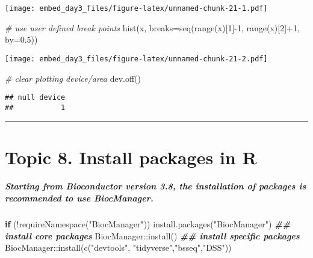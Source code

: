 \documentclass[
]{article}
\newenvironment{Shaded}{\begin{snugshade}}{\end{snugshade}}
\newcommand{\AttributeTok}[1]{\textcolor[rgb]{0.77,0.63,0.00}{#1}}
\newcommand{\CommentTok}[1]{\textcolor[rgb]{0.56,0.35,0.01}{\textit{#1}}}
\newcommand{\ControlFlowTok}[1]{\textcolor[rgb]{0.13,0.29,0.53}{\textbf{#1}}}
\newcommand{\DecValTok}[1]{\textcolor[rgb]{0.00,0.00,0.81}{#1}}
\newcommand{\DocumentationTok}[1]{\textcolor[rgb]{0.56,0.35,0.01}{\textbf{\textit{#1}}}}
\newcommand{\FloatTok}[1]{\textcolor[rgb]{0.00,0.00,0.81}{#1}}
\newcommand{\FunctionTok}[1]{\textcolor[rgb]{0.00,0.00,0.00}{#1}}
\newcommand{\NormalTok}[1]{#1}
\newcommand{\SpecialCharTok}[1]{\textcolor[rgb]{0.00,0.00,0.00}{#1}}
\newcommand{\StringTok}[1]{\textcolor[rgb]{0.31,0.60,0.02}{#1}}
\begin{document}
\texttt{[image: embed\_day3\_files/figure-latex/unnamed-chunk-21-1.pdf]}

\begin{Shaded}
\begin{Highlighting}[]
\CommentTok{\# use user defined break points}
\FunctionTok{hist}\NormalTok{(x, }\AttributeTok{breaks=}\FunctionTok{seq}\NormalTok{(}\FunctionTok{range}\NormalTok{(x)[}\DecValTok{1}\NormalTok{]}\SpecialCharTok{{-}}\DecValTok{1}\NormalTok{, }\FunctionTok{range}\NormalTok{(x)[}\DecValTok{2}\NormalTok{]}\SpecialCharTok{+}\DecValTok{1}\NormalTok{, }\AttributeTok{by=}\FloatTok{0.5}\NormalTok{))}
\end{Highlighting}
\end{Shaded}

\texttt{[image: embed\_day3\_files/figure-latex/unnamed-chunk-21-2.pdf]}

\begin{Shaded}
\begin{Highlighting}[]
\CommentTok{\# clear plotting device/area}
\FunctionTok{dev.off}\NormalTok{()}
\end{Highlighting}
\end{Shaded}

\begin{verbatim}
## null device 
##           1
\end{verbatim}

\begin{center}\rule{0.5\linewidth}{0.5pt}\end{center}

\hypertarget{topic-8.-install-packages-in-r}{%
\section{Topic 8. Install packages in
R}\label{topic-8.-install-packages-in-r}}

\hypertarget{starting-from-bioconductor-version-3.8-the-installation-of-packages-is-recommended-to-use-biocmanager.}{%
\subparagraph{Starting from Bioconductor version 3.8, the installation
of packages is recommended to use
BiocManager.}\label{starting-from-bioconductor-version-3.8-the-installation-of-packages-is-recommended-to-use-biocmanager.}}

\begin{Shaded}
\begin{Highlighting}[]
\ControlFlowTok{if}\NormalTok{ (}\SpecialCharTok{!}\FunctionTok{requireNamespace}\NormalTok{(}\StringTok{"BiocManager"}\NormalTok{))}
    \FunctionTok{install.packages}\NormalTok{(}\StringTok{"BiocManager"}\NormalTok{)}
\DocumentationTok{\#\# install core packages}
\NormalTok{BiocManager}\SpecialCharTok{::}\FunctionTok{install}\NormalTok{()}
\DocumentationTok{\#\# install specific packages}
\NormalTok{BiocManager}\SpecialCharTok{::}\FunctionTok{install}\NormalTok{(}\FunctionTok{c}\NormalTok{(}\StringTok{"devtools"}\NormalTok{, }\StringTok{"tidyverse"}\NormalTok{,}\StringTok{"bsseq"}\NormalTok{,}\StringTok{"DSS"}\NormalTok{))}
\end{Highlighting}
\end{Shaded}
\end{document}
